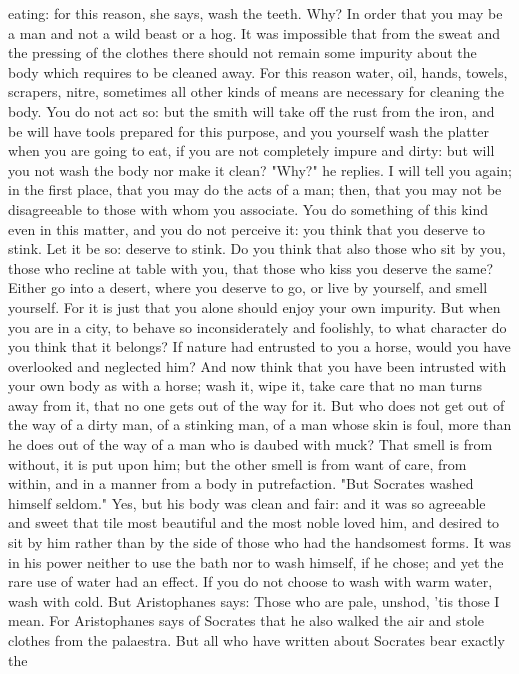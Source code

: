 \documentclass[a4paper]{article}
\begin{document}
eating: for this reason, she says, wash the teeth. Why? In order that you may
be a man and not a wild beast or a hog. It was impossible that from the sweat
and the pressing of the clothes there should not remain some impurity about the
body which requires to be cleaned away. For this reason water, oil, hands,
towels, scrapers, nitre, sometimes all other kinds of means are necessary for
cleaning the body. You do not act so: but the smith will take off the rust from
the iron, and be will have tools prepared for this purpose, and you yourself
wash the platter when you are going to eat, if you are not completely impure
and dirty: but will you not wash the body nor make it clean? "Why?" he replies.
I will tell you again; in the first place, that you may do the acts of a man;
then, that you may not be disagreeable to those with whom you associate. You do
something of this kind even in this matter, and you do not perceive it: you
think that you deserve to stink. Let it be so: deserve to stink. Do you think
that also those who sit by you, those who recline at table with you, that those
who kiss you deserve the same? Either go into a desert, where you deserve to
go, or live by yourself, and smell yourself. For it is just that you alone
should enjoy your own impurity. But when you are in a city, to behave so
inconsiderately and foolishly, to what character do you think that it belongs?
If nature had entrusted to you a horse, would you have overlooked and neglected
him? And now think that you have been intrusted with your own body as with a
horse; wash it, wipe it, take care that no man turns away from it, that no one
gets out of the way for it. But who does not get out of the way of a dirty man,
of a stinking man, of a man whose skin is foul, more than he does out of the
way of a man who is daubed with muck? That smell is from without, it is put
upon him; but the other smell is from want of care, from within, and in a
manner from a body in putrefaction.
    "But Socrates washed himself seldom." Yes, but his body was clean and fair:
and it was so agreeable and sweet that tile most beautiful and the most noble
loved him, and desired to sit by him rather than by the side of those who had
the handsomest forms. It was in his power neither to use the bath nor to wash
himself, if he chose; and yet the rare use of water had an effect. If you do
not choose to wash with warm water, wash with cold. But Aristophanes says:
       Those who are pale, unshod, 'tis those I mean.
For Aristophanes says of Socrates that he also walked the air and stole clothes
from the palaestra. But all who have written about Socrates bear exactly the
\end{document}
